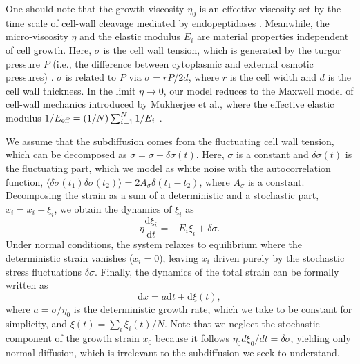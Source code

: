 \documentclass[aps, prl, twocolumn, longbibliography, linenumbers, superscriptaddress]{revtex4-2}
\begin{document}
One should note that the growth viscosity $\eta_0$ is an effective viscosity set by the time scale of cell-wall cleavage mediated by endopeptidases \cite{Mukherjee2025bacterial}. Meanwhile, the micro-viscosity $\eta$ and the elastic modulus $E_i$ are material properties independent of cell growth. Here, $\sigma$ is the cell wall tension, which is generated by the turgor pressure $P$ (i.e., the difference between cytoplasmic and external osmotic pressures) \cite{Arnoldi2000bacterial, Deng2011direct, Rojas2014response, Zhang2021measurement, Ye2025physical}. $\sigma$ is related to $P$ via $\sigma = rP/2d$, where $r$ is the cell width and $d$ is the cell wall thickness. In the limit $\eta\rightarrow 0$, our model reduces to the Maxwell model of cell-wall mechanics introduced by Mukherjee et al., where the effective elastic modulus $1/E_{\rm{eff}}= (1/N)\sum_{i=1}^{N}1/E_i$ \cite{Mukherjee2025bacterial}.

We assume that the subdiffusion comes from the fluctuating cell wall tension, which can be decomposed as $\sigma=\bar{\sigma}+\delta \sigma(t)$. Here, $\bar{\sigma}$ is a constant and $\delta\sigma(t)$ is the fluctuating part, which we model as white noise with the autocorrelation function, $\langle \delta \sigma(t_1)\delta \sigma(t_2)\rangle = 2A_\sigma \delta(t_1-t_2)$, where $A_{\sigma}$ is a constant. Decomposing the strain as a sum of a deterministic and a stochastic part, $x_i=\bar{x}_i +\xi_i$, we obtain the dynamics of $\xi_i$ as
\begin{equation}
	\eta \frac{\mathrm{d} \xi_i}{\mathrm{d}t} = -E_i \xi_i + \delta \sigma.
	\label{eq:constitutive}
\end{equation}
Under normal conditions, the system relaxes to equilibrium where the deterministic strain vanishes ($\bar{x}_i = 0$), leaving $x_i$ driven purely by the stochastic stress fluctuations $\delta \sigma$.
Finally, the dynamics of the total strain can be formally written as
\begin{equation}
	\mathrm{d}x = a \mathrm{d}t + \mathrm{d} \xi(t), 
	\label{voigt_xt}
\end{equation}
where $a = \bar{\sigma}/\eta_0$ is the deterministic growth rate, which we take to be constant for simplicity, and $\xi(t) = \sum_i \xi_i(t)/N$.
Note that we neglect the stochastic component of the growth strain $x_0$ because it follows $\eta_0  d\xi_0/dt=\delta \sigma$, yielding only normal diffusion, which is irrelevant to the subdiffusion we seek to understand.
\end{document}
